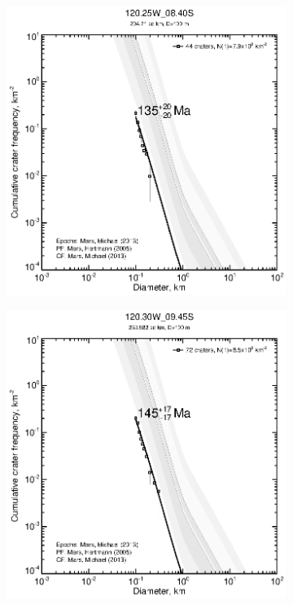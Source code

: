 \documentclass[12pt,letter]{article}
\begin{document}
\begin{figure}[h]
\begin{subfigure}{.33\textwidth}
\end{subfigure}
\begin{subfigure}{.33\textwidth}
  \includegraphics[width=\linewidth,clip,trim=1cm 1cm 1.5cm 1cm]{figures/craterstats/120-25W_08-40S_100m_cum.eps}
\end{subfigure}
\begin{subfigure}{.33\textwidth}
  \includegraphics[width=\linewidth,clip,trim=1cm 1cm 1.5cm 1cm]{figures/craterstats/120-30W_09-45S_100m_cum.eps}

\end{subfigure}
\end{figure}
\end{document}

